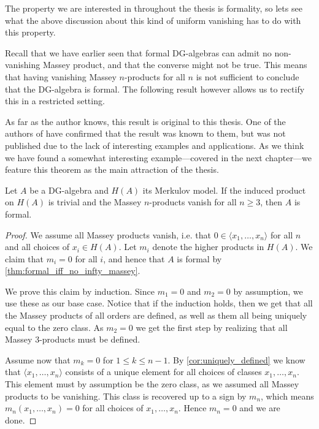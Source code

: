 The property we are interested in throughout the thesis is formality, so lets see what the above discussion about this kind of uniform vanishing has to do with this property. 

Recall that we have earlier seen that formal DG-algebras can admit no non-vanishing Massey product, and that the converse might not be true. This means that having vanishing Massey $n$-products for all $n$ is not sufficient to conclude that the DG-algebra is formal. The following result however allows us to rectify this in a restricted setting. 

As far as the author knows, this result is original to this thesis. One of the authors of \cite{detection} have confirmed that the result was known to them, but was not published due to the lack of interesting examples and applications. As we think we have found a somewhat interesting example---covered in the next chapter---we feature this theorem as the main attraction of the thesis. 

\begin{theorem}
\label{thm:cuptrivial_no_massey_then_formal}
Let $A$ be a DG-algebra and $H(A)$ its Merkulov model. If the induced product on $H(A)$ is trivial and the Massey $n$-products vanish for all $n\geq 3$, then $A$ is formal. 
\end{theorem}
\begin{proof}
We assume all Massey products vanish, i.e. that $0\in \langle x_1, \ldots, x_n\rangle $ for all $n$ and all choices of $x_i\in H(A)$. Let $m_i$ denote the higher products in $H(A)$. We claim that $m_i = 0$ for all $i$, and hence that $A$ is formal by \cref{thm:formal_iff_no_infty_massey}. 

We prove this claim by induction. Since $m_1 = 0$ and $m_2 = 0$ by assumption, we use these as our base case. Notice that if the induction holds, then we get that all the Massey products of all orders are defined, as well as them all being uniquely equal to the zero class. As $m_2=0$ we get the first step by realizing that all Massey 3-products must be defined. 

Assume now that $m_k = 0$ for $1\leq k\leq n-1$. By \cref{cor:uniquely_defined} we know that $\langle x_1, \ldots, x_n \rangle$ consists of a unique element for all choices of classes $x_1, \ldots, x_n$. This element must by assumption be the zero class, as we assumed all Massey products to be vanishing. This class is recovered up to a sign by $m_n$, which means $m_n(x_1,\ldots, x_n)=0$ for all choices of $x_1, \ldots, x_n$. Hence $m_n=0$ and we are done. 
\end{proof}

